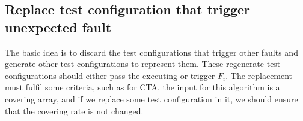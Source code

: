 \documentclass{sig-alternate}
\begin{document}


%
%
%
%

\subsection{Replace test configuration that trigger unexpected fault}

The basic idea is to discard the test configurations that trigger other faults and generate other test configurations to represent them. These regenerate test configurations should either pass the executing or trigger $F_{i}$.  The replacement must fulfil some criteria, such as for CTA, the input for this algorithm is a covering array, and if we replace some test configuration in it, we should ensure that the covering rate is not changed.
\end{document}
